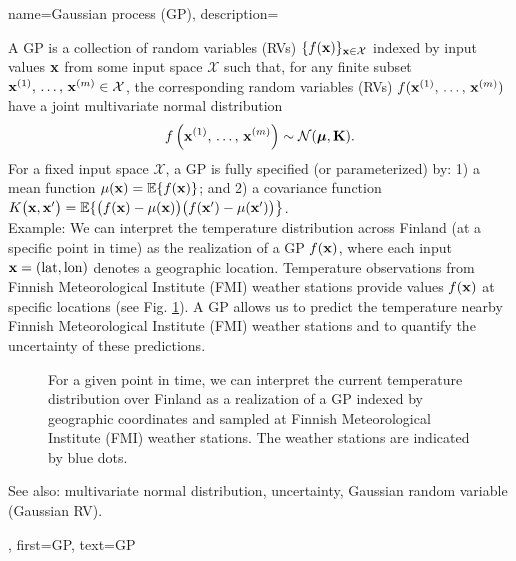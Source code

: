 {
{name={Gaussian process (GP)},
  description={A GP is a collection of random variables (RVs) 
  	$\{f({\bf x})\}_{{\bf x} \in \mathcal{X}}$ indexed by input values ${\bf x}$ 
  	from some input space $\mathcal{X}$ such that, for any finite subset 
  	${\bf x}^{(1)}, \,\ldots, \,{\bf x}^{(m)} \in \mathcal{X}$, 
  	the corresponding random variables (RVs) $f({\bf x}^{(1)}, \,\ldots, \,{\bf x}^{(m)})$ 
	have a joint multivariate normal distribution 
  	\[
  	f \left( {\bf x}^{(1)}, \,\ldots, \,{\bf x}^{(m)} \right) \sim \mathcal{N}(\boldsymbol{\mu}, \mathbf{K}).
  	\]
  	For a fixed input space $\mathcal{X}$, a GP is fully specified (or parameterized) by: 1) a mean function $\mu({\bf x}) = \mathbb{E} \{ f({\bf x})\}$;
  	and 2) a covariance function $K\big({\bf x},{\bf x}'\big)= \mathbb{E} \{ \big(f({\bf x})-\mu({\bf x})\big) \big(f({\bf x}')-\mu({\bf x}')\big) \big\}$.\\
  	Example: We can interpret the temperature distribution across Finland (at a specific 
  	point in time) as the realization of a GP $f({\bf x})$, where each input ${\bf x} = (\text{lat}, \text{lon})$ 
  	denotes a geographic location. Temperature observations from Finnish Meteorological Institute (FMI) weather stations provide 
  	values $f({\bf x})$ at specific locations (see Fig. \ref{fig_gp_FMI_dict}). A GP allows us to 
  	predict the temperature nearby Finnish Meteorological Institute (FMI) weather stations and to quantify the uncertainty 
  	of these predictions. 
  	\begin{figure}[H]
  	\begin{center}
		\vspace*{-15mm}
	\end{center}
	\caption{For a given point in time, we can interpret the current temperature distribution 
	over Finland as a realization of a GP indexed by geographic coordinates and 
	sampled at Finnish Meteorological Institute (FMI) weather stations. The weather stations are indicated by blue dots. \label{fig_gp_FMI_dict}}
	\end{figure}
	See also: multivariate normal distribution, uncertainty, Gaussian random variable (Gaussian RV).}, 
  first={GP}, 
  text={GP}
}

}
